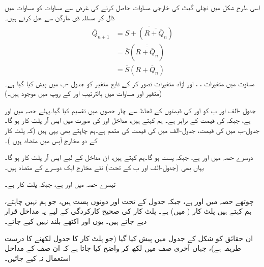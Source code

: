 اسی طرح شکل  میں نچلی گیٹ کی خارجی مساوات حاصل کرنے کی غرض سے مساوات  کو مساوات  میں ڈال کر مسئلہ ڈی مارگن سے حل کرتے ہیں۔
\begin{gather}
\begin{aligned}\label{مساوات_ترتیبی_ایس_آر_متمم}
\overline{Q}_{n+1}&=\overline{S+(\overline{R+\overline{Q}_n})}\\
&=\overline{S}(\overline{\overline{R+\overline{Q}_n}})\\
&=\overline{S}(R+\overline{Q}_n)
\end{aligned}
\end{gather}
مساوت  میں متغیرات ، ، اور  آزاد متغیرات تصور کر کے تابع متغیر  کو جدول  -ب میں پیش کیا گیا ہے۔(متغیر  اور  مساوات میں بالترتیب  اور  کے روپ میں موجود ہیں۔)



 جدول -الف اور ب کو  اور  کی قیمتوں کے لحاظ سے چار حصوں میں تقسیم کیا گیا۔پہلے حصہ میں  اور  ہے، جبکہ  کی قیمت  کے برابر ہے۔ ہم کہتے ہیں، مداخل  اور  کی صورت میں ایس آر پلٹ کار  ہو گا۔ جدول-ب
 میں  کی قیمت، جدول-الف میں کی قیمت کی متمم ہے۔ہم چاہتے بھی یہی ہیں (کہ پلٹ کار کے دو مخارج آپس میں متضاد ہوں )۔
 
دوسرے حصہ میں  اور  ہے، جبکہ  پست ہو گا۔ہم کہتے ہیں، ان مداخل کے لیے ایس آر پلٹ کار  ہو گا۔یہاں بھی (جدول-الف اور ب کے تحت) نئے مخارج ایک دوسرے کے متضاد ہیں۔

تیسرے حصہ میں  اور  ہے، جبکہ پلٹ کار  ہے۔

چوتھے حصہ میں  اور  ہے، جبکہ جدول کے تحت  اور  دونوں پست ہیں، جو ہم نہیں چاہتے، ہم کہتے ہیں پلٹ کار ( میں) ہے۔ پلٹ کار کی صحیح کارکردگی کے لیے یہ مداخل  قرار دیے جاتے ہیں۔ یوں  اور  اکٹھے بلند نہیں کیے جاتے۔

ان حقائق کو شکل  کے جدول میں پیش کیا گیا (جو پلٹ کار کا جدول لکھنے کا درست طریقہ ہے)، جہاں آخری صف میں  لکھ کر واضح کیا جاتا ہے کہ ان صف کے مداخل استعمال نہ کیے جائیں۔ 

